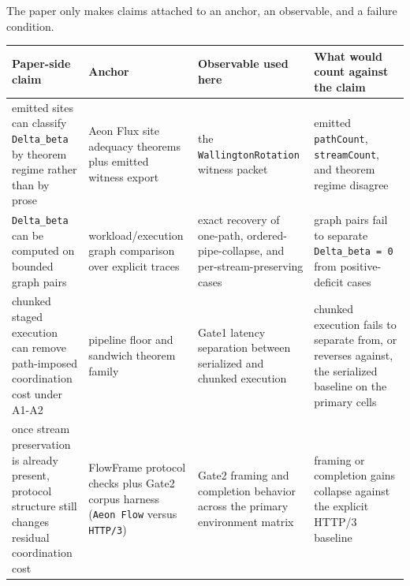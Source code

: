 \documentclass[
  11pt,
]{article}
\newcounter{none} %
\begin{document}
The paper only makes claims attached to an anchor, an observable, and a
failure condition.

{\def\LTcaptype{none} %
\begin{longtable}[]{@{}
  >{\raggedright\arraybackslash}p{}
  >{\raggedright\arraybackslash}p{}
  >{\raggedright\arraybackslash}p{}
  >{\raggedright\arraybackslash}p{}@{}}
\toprule\noalign{}
\begin{minipage}[b]{\linewidth}\raggedright
Paper-side claim
\end{minipage} & \begin{minipage}[b]{\linewidth}\raggedright
Anchor
\end{minipage} & \begin{minipage}[b]{\linewidth}\raggedright
Observable used here
\end{minipage} & \begin{minipage}[b]{\linewidth}\raggedright
What would count against the claim
\end{minipage} \\
\midrule\noalign{}
\endhead
\bottomrule\noalign{}
\endlastfoot
emitted sites can classify \texttt{Delta\_beta} by theorem regime rather
than by prose & Aeon Flux site adequacy theorems plus emitted witness
export & the \texttt{WallingtonRotation} witness packet & emitted
\texttt{pathCount}, \texttt{streamCount}, and theorem regime disagree \\
\texttt{Delta\_beta} can be computed on bounded graph pairs &
workload/execution graph comparison over explicit traces & exact
recovery of one-path, ordered-pipe-collapse, and per-stream-preserving
cases & graph pairs fail to separate \texttt{Delta\_beta\ =\ 0} from
positive-deficit cases \\
chunked staged execution can remove path-imposed coordination cost under
A1-A2 & pipeline floor and sandwich theorem family & Gate1 latency
separation between serialized and chunked execution & chunked execution
fails to separate from, or reverses against, the serialized baseline on
the primary cells \\
once stream preservation is already present, protocol structure still
changes residual coordination cost & FlowFrame protocol checks plus
Gate2 corpus harness (\texttt{Aeon\ Flow} versus \texttt{HTTP/3}) &
Gate2 framing and completion behavior across the primary environment
matrix & framing or completion gains collapse against the explicit
HTTP/3 baseline \\
\end{longtable}
}
\end{document}
